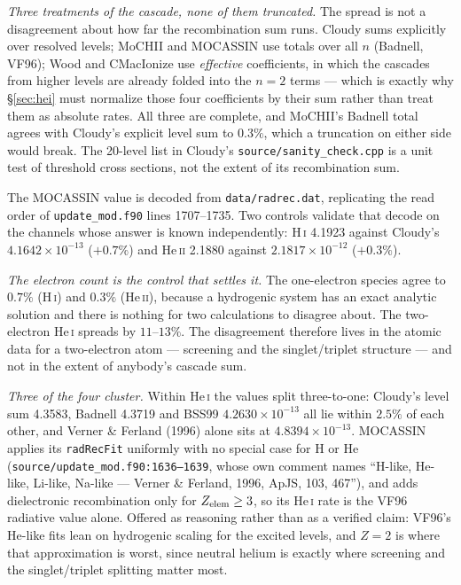 \documentclass[11pt]{my_memo}
\begin{document}
\emph{Three treatments of the cascade, none of them truncated.}  The spread is not a disagreement about how far the recombination sum runs.  Cloudy sums explicitly over resolved levels; MoCHII and MOCASSIN use totals over all $n$ (Badnell, VF96); Wood and CMacIonize use \emph{effective} coefficients, in which the cascades from higher levels are already folded into the $n = 2$ terms --- which is exactly why \S\ref{sec:hei} must normalize those four coefficients by their sum rather than treat them as absolute rates.  All three are complete, and MoCHII's Badnell total agrees with Cloudy's explicit level sum to $0.3\%$, which a truncation on either side would break.  The 20-level list in Cloudy's \texttt{source/sanity\_check.cpp} is a unit test of threshold cross sections, not the extent of its recombination sum.

The MOCASSIN value is decoded from \texttt{data/radrec.dat}, replicating the read order of \texttt{update\_mod.f90} lines 1707--1735.  Two controls validate that decode on the channels whose answer is known independently: H\,\textsc{i} 4.1923 against Cloudy's $4.1642\times10^{-13}$ ($+0.7\%$) and He\,\textsc{ii} 2.1880 against $2.1817\times10^{-12}$ ($+0.3\%$).

\emph{The electron count is the control that settles it.}  The one-electron species agree to $0.7\%$ (H\,\textsc{i}) and $0.3\%$ (He\,\textsc{ii}), because a hydrogenic system has an exact analytic solution and there is nothing for two calculations to disagree about.  The two-electron He\,\textsc{i} spreads by $11$--$13\%$.  The disagreement therefore lives in the atomic data for a two-electron atom --- screening and the singlet/triplet structure --- and not in the extent of anybody's cascade sum.

\emph{Three of the four cluster.}  Within He\,\textsc{i} the values split three-to-one: Cloudy's level sum 4.3583, Badnell 4.3719 and BSS99 $4.2630\times10^{-13}$ all lie within $2.5\%$ of each other, and Verner \& Ferland (1996) alone sits at $4.8394\times10^{-13}$.  MOCASSIN applies its \texttt{radRecFit} uniformly with no special case for H or He (\texttt{source/update\_mod.f90:1636--1639}, whose own comment names ``H-like, He-like, Li-like, Na-like --- Verner \& Ferland, 1996, ApJS, 103, 467''), and adds dielectronic recombination only for $Z_{\rm elem}\ge3$, so its He\,\textsc{i} rate is the VF96 radiative value alone.  Offered as reasoning rather than as a verified claim: VF96's He-like fits lean on hydrogenic scaling for the excited levels, and $Z=2$ is where that approximation is worst, since neutral helium is exactly where screening and the singlet/triplet splitting matter most.
\end{document}
